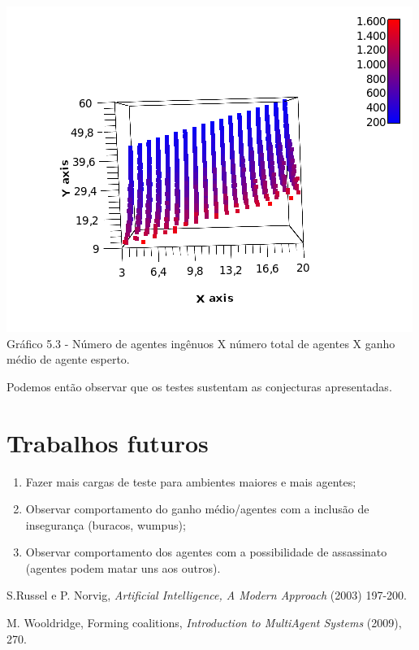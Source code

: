 \documentclass[11pt,reqno]{article}
\begin{document}
$$$$

\begin{center}
   \includegraphics[scale=0.6]{Figuras/GanhoSA10(NAxNI).png}\\
  \scriptsize{Gráfico 5.3 - Número de agentes ingênuos X número total de agentes X ganho médio de agente esperto.}
\end{center}

Podemos então observar que os testes sustentam as conjecturas apresentadas.

\section{Trabalhos futuros}

\begin{enumerate}
  \item Fazer mais cargas de teste para ambientes maiores e mais agentes;
  \item Observar comportamento do ganho médio/agentes com a inclusão de insegurança (buracos, wumpus);
  \item Observar comportamento dos agentes com a possibilidade de assassinato (agentes podem matar uns aos outros).
\end{enumerate}


\begin{thebibliography}{99}

 S.Russel e P. Norvig, {\em Artificial Intelligence, A Modern Approach} (2003) 197-200.

 M. Wooldridge, Forming coalitions, {\em Introduction to MultiAgent Systems} (2009), 270.

\end{thebibliography}
\end{document}
